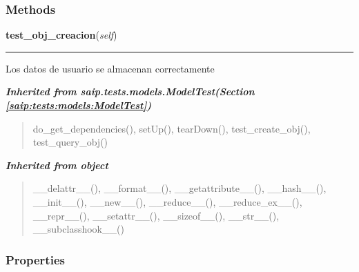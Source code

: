   \subsubsection{Methods}

    \label{saip:tests:models:test_usuario:TestUsuario:test_obj_creacion}

    \vspace{0.5ex}

\hspace{.8\funcindent}\begin{boxedminipage}{\funcwidth}

    \raggedright \textbf{test\_obj\_creacion}(\textit{self})

    \vspace{-1.5ex}

    \rule{\textwidth}{0.5\fboxrule}
\setlength{\parskip}{2ex}
    Los datos de usuario se almacenan correctamente

\setlength{\parskip}{1ex}
    \end{boxedminipage}


\large{\textbf{\textit{Inherited from saip.tests.models.ModelTest\textit{(Section \ref{saip:tests:models:ModelTest})}}}}

\begin{quote}
do\_get\_dependencies(), setUp(), tearDown(), test\_create\_obj(), test\_query\_obj()
\end{quote}

\large{\textbf{\textit{Inherited from object}}}

\begin{quote}
\_\_delattr\_\_(), \_\_format\_\_(), \_\_getattribute\_\_(), \_\_hash\_\_(), \_\_init\_\_(), \_\_new\_\_(), \_\_reduce\_\_(), \_\_reduce\_ex\_\_(), \_\_repr\_\_(), \_\_setattr\_\_(), \_\_sizeof\_\_(), \_\_str\_\_(), \_\_subclasshook\_\_()
\end{quote}


  \subsubsection{Properties}

